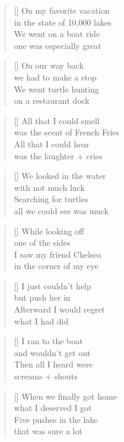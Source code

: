 \settowidth{\versewidth}{was the scent of French fries}
\begin{verse}[\versewidth]
On my favorite vacation\\
in the state of 10,000 lakes\\
We went on a boat ride\\
one was especially great\\
\end{verse}

\begin{verse}[\versewidth]
On our way back\\
we had to make a stop\\
We went turtle hunting\\
on a restaurant dock\\
\end{verse}

\begin{verse}[\versewidth]
All that I could smell\\
was the scent of French Fries\\
All that I could hear\\
was the laughter + cries\\
\end{verse}

\begin{verse}[\versewidth]
We looked in the water\\
with not much luck\\
Searching for turtles\\
all we could see was muck\\
\end{verse}

\begin{verse}[\versewidth]
While looking off\\
one of the sides\\
I saw my friend Chelsea\\
in the corner of my eye\\
\end{verse}

\begin{verse}[\versewidth]
I just couldn't help\\
but push her in\\
Afterward I would regret\\
what I had did\\
\end{verse}

\begin{verse}[\versewidth]
I ran to the boat\\
and wouldn't get out\\
Then all I heard were\\
screams + shouts\\
\end{verse}

\begin{verse}[\versewidth]
When we finally got home\\
what I deserved I got\\
Five pushes in the lake\\
that was sure a lot\\
\end{verse}

